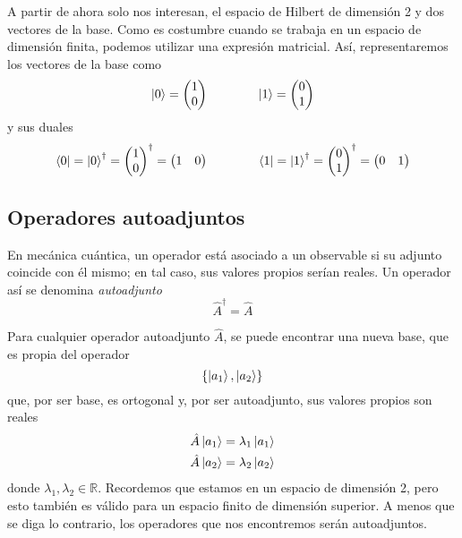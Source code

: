 A partir de ahora solo nos interesan, el  espacio de Hilbert de dimensión 2
y dos vectores de la base.
Como es costumbre cuando se trabaja en un espacio de dimensión finita, podemos
utilizar una expresión matricial. Así, representaremos los vectores de la base
como
\[
  \ket{0} = \begin{pmatrix}1 \\ 0\end{pmatrix}
  \hspace{4em}
  \ket{1} = \begin{pmatrix}0 \\ 1\end{pmatrix}
\]
y sus duales
\[
  \bra{0} = \ket{0}^\dagger
  = \begin{pmatrix}1 \\ 0\end{pmatrix}^\dagger
  = \begin{pmatrix}1 & 0\end{pmatrix}
  \hspace{4em}
  \bra{1} = \ket{1}^\dagger
  = \begin{pmatrix}0 \\ 1\end{pmatrix}^\dagger
  = \begin{pmatrix}0 & 1\end{pmatrix}
\]

\subsection{Operadores autoadjuntos}
En mecánica cuántica, un operador está asociado a un observable si su adjunto
coincide con él mismo; en tal caso, sus valores propios serían reales. Un
operador así se denomina \emph{autoadjunto}
\[
  \hat{A}^\dagger = \hat{A}
\]

Para cualquier operador autoadjunto $\hat{A}$, se puede encontrar una nueva
base, que es propia del operador
\[
  \{\ket{a_1}, \ket{a_2}\}
\]
que, por ser base, es ortogonal y, por ser autoadjunto, sus valores propios son
reales
\begin{align*}
  &\hat{A} \ket{a_1} = \lambda_1 \ket{a_1}\\
  &\hat{A} \ket{a_2} = \lambda_2 \ket{a_2}
\end{align*}
donde $\lambda_{1}, \lambda_{2} \in \mathbb{R}$.
Recordemos que estamos en un espacio de dimensión 2, pero esto también es
válido para un espacio finito de dimensión superior.
A menos que se diga lo contrario, los operadores que nos encontremos serán
autoadjuntos.

